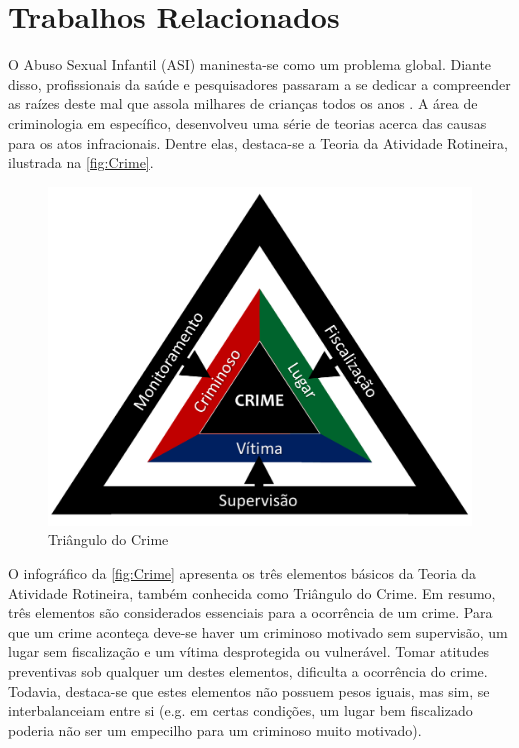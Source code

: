 \chapter{Trabalhos Relacionados}\label{ch:Relacionados}


O Abuso Sexual Infantil (ASI) maninesta-se como um problema global. Diante disso, profissionais da saúde e pesquisadores passaram a se dedicar a compreender as raízes  deste mal que assola milhares de crianças todos os anos \cite{deslandes1994atenccao, dahlberg2006violencia, da2017violencia}. A área de criminologia em específico, desenvolveu uma série de teorias acerca das causas para os atos infracionais. Dentre elas, destaca-se a Teoria da Atividade Rotineira, ilustrada na \autoref{fig:Crime}.

\begin{figure}
  \caption{\label{fig:Crime}Triângulo do Crime}
      \begin{center}
        \includegraphics[width=\linewidth]{./Figuras/TrianguloCrime.pdf}
      \end{center}
\end{figure}

O infográfico da \autoref{fig:Crime} apresenta os três elementos básicos da Teoria da Atividade Rotineira, também conhecida como Triângulo do Crime. Em resumo, três elementos são considerados essenciais para a ocorrência de um crime. Para que um crime aconteça deve-se haver um criminoso motivado sem supervisão, um lugar sem fiscalização e um vítima desprotegida ou vulnerável. Tomar atitudes preventivas sob qualquer um destes elementos, dificulta a ocorrência do crime. Todavia, destaca-se que estes elementos não possuem pesos iguais, mas sim, se interbalanceiam entre si (e.g. em certas condições, um lugar bem fiscalizado poderia não ser um empecilho para um criminoso muito motivado).



